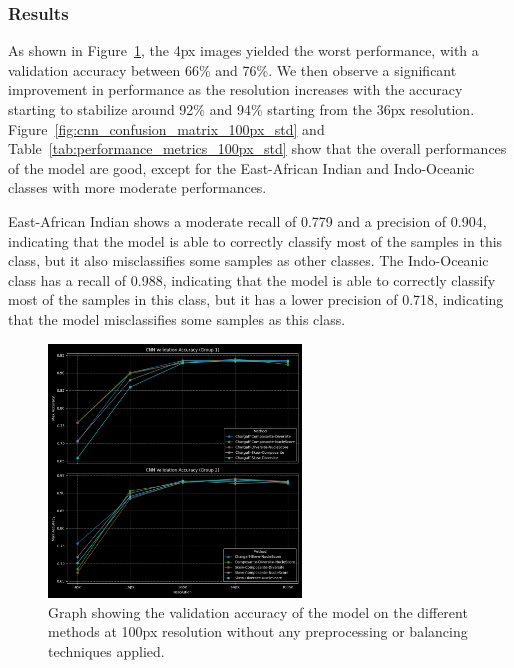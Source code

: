 \subsubsection{Results}
\label{subsubsec:results_initial_testing}

As shown in Figure~\ref{fig:cnn_validation_accuracy_std}, the 4px images yielded the worst performance, with a validation accuracy between 66\%
and 76\%. We then observe a significant improvement in performance as the resolution increases with the accuracy starting to stabilize
around 92\% and 94\% starting from the 36px resolution. Figure~\ref{fig:cnn_confusion_matrix_100px_std} and Table~\ref{tab:performance_metrics_100px_std}
show that the overall performances of the model are good, except for the East-African Indian and Indo-Oceanic classes with more moderate performances.

East-African Indian shows a moderate recall of 0.779 and a precision of 0.904, indicating that the model is able to correctly classify
most of the samples in this class, but it also misclassifies some samples as other classes. The Indo-Oceanic class has a recall of 0.988,
indicating that the model is able to correctly classify most of the samples in this class, but it has a lower precision of 0.718, indicating
that the model misclassifies some samples as this class.

\begin{figure}[H]
	\centering
	\includegraphics[width=0.6\textwidth]{../imgs/graphs/standard/cnn_validation_accuracy_groups_mask_5_std.png}
	\caption{Graph showing the validation accuracy of the model on the different methods at 100px resolution without any preprocessing or
		balancing techniques applied.}
	\label{fig:cnn_validation_accuracy_std}
\end{figure}

